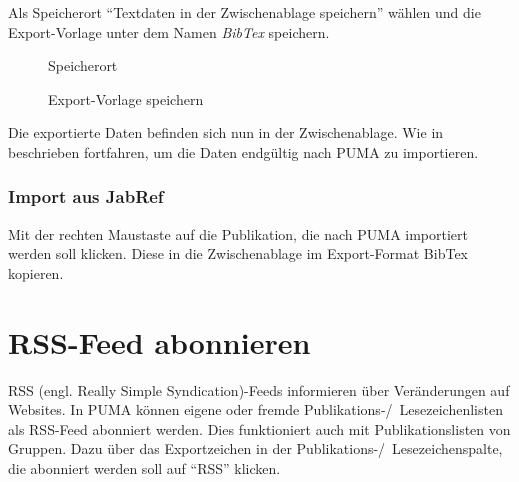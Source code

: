  Als Speicherort \enquote{Textdaten in der Zwischenablage speichern} wählen und die Export-Vorlage unter dem Namen \textit{BibTex} speichern.
   
\begin{figure}[h!]
 \centering
 \caption{Speicherort}
 \label{fig:speicherort}
\end{figure}

\begin{figure}[h!]
 \centering
 \caption{Export-Vorlage speichern}
 \label{fig:exportVorlageSpeichern}
\end{figure}

Die exportierte Daten befinden sich nun in der Zwischenablage. Wie in  beschrieben fortfahren, um die Daten endgültig nach PUMA zu importieren.\newline

\subsubsection{Import aus JabRef}\label{sss:importJabRef}
Mit der rechten Maustaste auf die Publikation, die nach PUMA importiert werden soll klicken.
Diese in die Zwischenablage im Export-Format BibTex kopieren.


\section{RSS-Feed abonnieren} 
\label{sec:rssFeedAbonnieren}
RSS (engl. Really Simple Syndication)-Feeds informieren über Veränderungen auf Websites. In PUMA können eigene oder fremde Publikations-/~Lesezeichenlisten als RSS-Feed abonniert werden. Dies funktioniert auch mit Publikationslisten von Gruppen. Dazu über das Exportzeichen in der Publikations-/~Lesezeichenspalte, die abonniert werden soll auf \enquote{RSS} klicken. 

